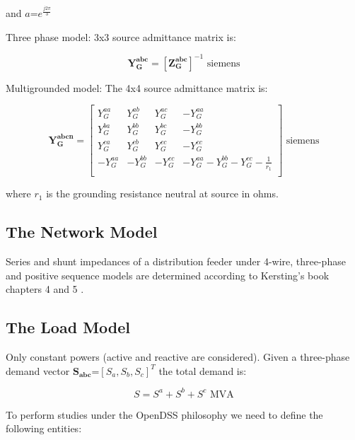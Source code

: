 \documentclass[12pt]{article}
\begin{document}
and $a$=$e^{\frac{j 2  \pi}{3}}$

Three phase model: 3x3 source admittance matrix is:

\begin{equation}
\mathbf{Y^{abc}_{G}}=[\mathbf{Z^{abc}_{G}}]^{-1} \mbox{ siemens}
\end{equation}

Multigrounded model: The 4x4 source admittance matrix is:

\begin{equation}
\mathbf{Y^{abcn}_{G}}=\left[ \begin{array}{cccc}
               {Y}^{aa}_{G}  & {Y}^{ab}_{G}   &{Y}^{ac}_{G}  & -{Y}^{aa}_{G}\\
               {Y}^{ba}_{G} & {Y}^{bb}_{G}  &{Y}^{bc}_{G} & -{Y}^{bb}_{G}\\
               {Y}^{ca}_{G} & {Y}^{cb}_{G}  &{Y}^{cc}_{G} & -{Y}^{cc}_{G}\\
              -{Y}^{aa}_{G} & -{Y}^{bb}_{G} &-{Y}^{cc}_{G} & -{Y}^{aa}_{G}-{Y}^{bb}_{G}-{Y}^{cc}_{G}-\frac{1}{r_1}\\
             \end{array}
           \right] \mbox{ siemens}
           \end{equation}

where $r_1$ is the grounding resistance neutral at source in ohms.

\subsection{The Network Model}

Series and shunt impedances of a distribution feeder under 4-wire, three-phase and positive sequence models
are determined according to Kersting's book chapters 4 and 5 \cite{2}.

\subsection{The Load Model}

Only constant powers (active and reactive are considered). Given a three-phase demand vector $\mathbf{S_{abc}}$=$[{S}_{a},{S}_{b},{S}_{c}]^T$ the total demand is:

\begin{equation}
  {S}={S}^{a}+{S}^{b}+{S}^{c}\mbox{ MVA}
\end{equation}

To perform studies under the OpenDSS philosophy we need to define the following entities:
\end{document}
